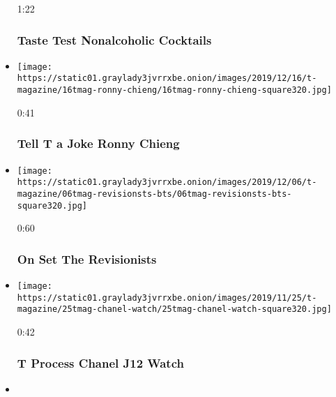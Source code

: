 \begin{itemize}
  1:22

  \hypertarget{taste-test--nonalcoholic-cocktails}{%
  \subsubsection{Taste Test \textbar{} Nonalcoholic
  Cocktails}\label{taste-test--nonalcoholic-cocktails}}
\item
  \href{https://www.nytimes3xbfgragh.onion/video/t-magazine/100000006877761/tell-t-a-joke-ronny-chieng.html?action=click\&module=video-series-bar\&region=header\&pgtype=Article\&playlistId=video/t-magazine}{}

  \texttt{[image: https://static01.graylady3jvrrxbe.onion/images/2019/12/16/t-magazine/16tmag-ronny-chieng/16tmag-ronny-chieng-square320.jpg]}

  0:41

  \hypertarget{tell-t-a-joke--ronny-chieng}{%
  \subsubsection{Tell T a Joke \textbar{} Ronny
  Chieng}\label{tell-t-a-joke--ronny-chieng}}
\item
  \href{https://www.nytimes3xbfgragh.onion/video/t-magazine/100000006856148/on-set-the-revisionists.html?action=click\&module=video-series-bar\&region=header\&pgtype=Article\&playlistId=video/t-magazine}{}

  \texttt{[image: https://static01.graylady3jvrrxbe.onion/images/2019/12/06/t-magazine/06tmag-revisionsts-bts/06tmag-revisionsts-bts-square320.jpg]}

  0:60

  \hypertarget{on-set--the-revisionists}{%
  \subsubsection{On Set \textbar{} The
  Revisionists}\label{on-set--the-revisionists}}
\item
  \href{https://www.nytimes3xbfgragh.onion/video/t-magazine/100000006834800/t-process-chanel-j12-watch.html?action=click\&module=video-series-bar\&region=header\&pgtype=Article\&playlistId=video/t-magazine}{}

  \texttt{[image: https://static01.graylady3jvrrxbe.onion/images/2019/11/25/t-magazine/25tmag-chanel-watch/25tmag-chanel-watch-square320.jpg]}

  0:42

  \hypertarget{t-process--chanel-j12-watch}{%
  \subsubsection{T Process \textbar{} Chanel J12
  Watch}\label{t-process--chanel-j12-watch}}
\item
  \href{https://www.nytimes3xbfgragh.onion/video/t-magazine/100000006806415/make-t-something-carol-lim-humberto-leon.html?action=click\&module=video-series-bar\&region=header\&pgtype=Article\&playlistId=video/t-magazine}{}


\end{itemize}
